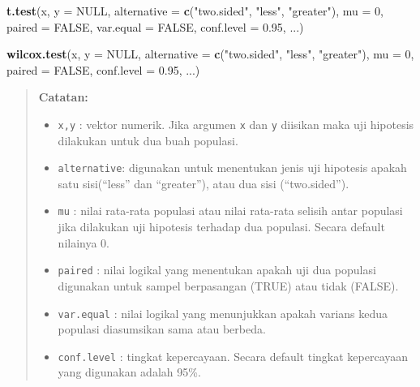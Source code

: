 \documentclass[
]{book}
\newenvironment{Shaded}{\begin{snugshade}}{\end{snugshade}}
\newcommand{\AttributeTok}[1]{\textcolor[rgb]{0.13,0.29,0.53}{#1}}
\newcommand{\ConstantTok}[1]{\textcolor[rgb]{0.56,0.35,0.01}{#1}}
\newcommand{\DecValTok}[1]{\textcolor[rgb]{0.00,0.00,0.81}{#1}}
\newcommand{\FloatTok}[1]{\textcolor[rgb]{0.00,0.00,0.81}{#1}}
\newcommand{\FunctionTok}[1]{\textcolor[rgb]{0.13,0.29,0.53}{\textbf{#1}}}
\newcommand{\NormalTok}[1]{#1}
\newcommand{\StringTok}[1]{\textcolor[rgb]{0.31,0.60,0.02}{#1}}
\providecommand{\tightlist}{%
  \setlength{\itemsep}{0pt}\setlength{\parskip}{0pt}}
\theoremstyle{definition}
\theoremstyle{definition}
\theoremstyle{definition}
\theoremstyle{definition}
\theoremstyle{remark}
\begin{document}
\begin{Shaded}
\begin{Highlighting}[]
\FunctionTok{t.test}\NormalTok{(x, }\AttributeTok{y =} \ConstantTok{NULL}\NormalTok{,}
       \AttributeTok{alternative =} \FunctionTok{c}\NormalTok{(}\StringTok{"two.sided"}\NormalTok{, }\StringTok{"less"}\NormalTok{, }\StringTok{"greater"}\NormalTok{),}
       \AttributeTok{mu =} \DecValTok{0}\NormalTok{, }\AttributeTok{paired =} \ConstantTok{FALSE}\NormalTok{, }\AttributeTok{var.equal =} \ConstantTok{FALSE}\NormalTok{,}
       \AttributeTok{conf.level =} \FloatTok{0.95}\NormalTok{, ...)}

\FunctionTok{wilcox.test}\NormalTok{(x, }\AttributeTok{y =} \ConstantTok{NULL}\NormalTok{,}
            \AttributeTok{alternative =} \FunctionTok{c}\NormalTok{(}\StringTok{"two.sided"}\NormalTok{, }\StringTok{"less"}\NormalTok{, }\StringTok{"greater"}\NormalTok{),}
            \AttributeTok{mu =} \DecValTok{0}\NormalTok{, }\AttributeTok{paired =} \ConstantTok{FALSE}\NormalTok{, }\AttributeTok{conf.level =} \FloatTok{0.95}\NormalTok{, ...)}
\end{Highlighting}
\end{Shaded}

\begin{quote}
\textbf{Catatan:}

\begin{itemize}
\tightlist
\item
  \texttt{x,y} : vektor numerik. Jika argumen \texttt{x} dan \texttt{y} diisikan maka uji hipotesis dilakukan untuk dua buah populasi.
\item
  \texttt{alternative}: digunakan untuk menentukan jenis uji hipotesis apakah satu sisi(``less'' dan ``greater''), atau dua sisi (``two.sided'').
\item
  \texttt{mu} : nilai rata-rata populasi atau nilai rata-rata selisih antar populasi jika dilakukan uji hipotesis terhadap dua populasi. Secara default nilainya 0.
\item
  \texttt{paired} : nilai logikal yang menentukan apakah uji dua populasi digunakan untuk sampel berpasangan (TRUE) atau tidak (FALSE).
\item
  \texttt{var.equal} : nilai logikal yang menunjukkan apakah varians kedua populasi diasumsikan sama atau berbeda.
\item
  \texttt{conf.level} : tingkat kepercayaan. Secara default tingkat kepercayaan yang digunakan adalah 95\%.
\end{itemize}
\end{quote}
\end{document}
